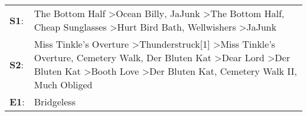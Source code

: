 \begin{supertabular}{p{0.03\textwidth}p{0.92\textwidth}}
 \textbf{S1}:  &                                                                                                                                                                                     The Bottom Half\textsuperscript{} \textgreater \enspace Ocean Billy\textsuperscript{}, \enspace JaJunk\textsuperscript{} \textgreater \enspace The Bottom Half\textsuperscript{}, \enspace Cheap Sunglasses\textsuperscript{} \textgreater \enspace Hurt Bird Bath\textsuperscript{}, \enspace Wellwishers\textsuperscript{} \textgreater \enspace JaJunk\textsuperscript{}  \enspace  \\
 \textbf{S2}:  &  Miss Tinkle's Overture\textsuperscript{} \textgreater \enspace Thunderstruck[1]\textsuperscript{} \textgreater \enspace Miss Tinkle's Overture\textsuperscript{}, \enspace Cemetery Walk\textsuperscript{}, \enspace Der Bluten Kat\textsuperscript{} \textgreater \enspace Dear Lord\textsuperscript{} \textgreater \enspace Der Bluten Kat\textsuperscript{} \textgreater \enspace Booth Love\textsuperscript{} \textgreater \enspace Der Bluten Kat\textsuperscript{}, \enspace Cemetery Walk II\textsuperscript{}, \enspace Much Obliged\textsuperscript{}  \enspace  \\
 \textbf{E1}:  &                                                                                                                                                                                                                                                                                                                                                                                                                                                                                                                                    Bridgeless\textsuperscript{}  \enspace  \\
\end{supertabular}
